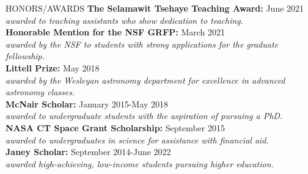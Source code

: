 \documentclass{resume} %
\begin{document}
\begin{rSection}{HONORS/AWARDS}
\textbf{The Selamawit Tsehaye Teaching Award:} \hfill June 2021\\
\textit{awarded to teaching assistants who show dedication to teaching.}\\

\textbf{Honorable Mention for the NSF GRFP:} \hfill March 2021\\
\textit{awarded by the NSF to students with strong applications for the graduate fellowship.}\\

\textbf{Littell Prize: } \hfill May 2018\\
\textit{awarded by the Wesleyan astronomy department for excellence in advanced astronomy classes.}\\

\textbf{McNair Scholar:} \hfill January 2015-May 2018\\
\textit{awarded to undergraduate students with the aspiration of pursuing a PhD.}\\
\textbf{NASA CT Space Grant Scholarship:}	\hfill September 2015\\
\textit{awarded to undergraduates in science for assistance with financial aid.}\\
\textbf{Janey Scholar:}	\hfill September 2014-June 2022\\
\textit{awarded high-achieving, low-income students pursuing higher education.}\\
\end{rSection}
\end{document}
